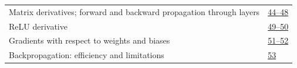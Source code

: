 \documentclass[10pt]{article}
\newcommand{\currenttopic}{Quick lookup}
\begin{document}
\begin{longtable}{@{}P{.79\linewidth}P{.17\linewidth}@{}}
Matrix derivatives; forward and backward propagation through layers & \href{../Lecture\%20Slides/3.4.\%20Deep\%20Learning\%20Fundamentals\%20II.pdf\#page=44}{44--48}\\[3pt]
ReLU derivative & \href{../Lecture\%20Slides/3.4.\%20Deep\%20Learning\%20Fundamentals\%20II.pdf\#page=49}{49--50}\\[3pt]
Gradients with respect to weights and biases & \href{../Lecture\%20Slides/3.4.\%20Deep\%20Learning\%20Fundamentals\%20II.pdf\#page=51}{51--52}\\[3pt]
Backpropagation: efficiency and limitations & \href{../Lecture\%20Slides/3.4.\%20Deep\%20Learning\%20Fundamentals\%20II.pdf\#page=53}{53}\\[3pt]
\bottomrule\end{longtable}

\clearpage\renewcommand{\currenttopic}{Topic 4}
\end{document}
